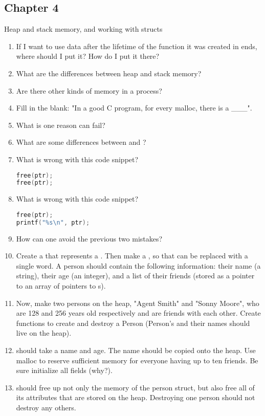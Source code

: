 \subsection{Chapter 4}

Heap and stack memory, and working with structs

\begin{enumerate}
\item If I want to use data after the lifetime of the function it was created in ends, where should I put it? How do I put it there?
\item What are the differences between heap and stack memory?
\item Are there other kinds of memory in a process?
\item Fill in the blank: "In a good C program, for every malloc, there is a \_\_\_".
\item What is one reason  can fail?
\item What are some differences between  and ?
\item What is wrong with this code snippet?
\begin{lstlisting}[language=C]
free(ptr);
free(ptr);
\end{lstlisting}
\item What is wrong with this code snippet?
\begin{lstlisting}[language=C]
free(ptr);
printf("%s\n", ptr);
\end{lstlisting}
\item How can one avoid the previous two mistakes? 
\item Create a  that represents a .
  Then make a , so that  can be replaced with a single word.
  A person should contain the following information: their name (a string), their age (an integer), and a list of their friends (stored as a pointer to an array of pointers to s).
\item Now, make two persons on the heap, "Agent Smith" and "Sonny Moore", who are 128 and 256 years old respectively and are friends with each other.
Create functions to create and destroy a Person (Person's and their names should live on the heap).
\item {} should take a name and age.
  The name should be copied onto the heap.
  Use malloc to reserve sufficient memory for everyone having up to ten friends.
  Be sure initialize all fields (why?).
\item {} should free up not only the memory of the person struct, but also free all of its attributes that are stored on the heap. Destroying one person should not destroy any others.
\end{enumerate}

